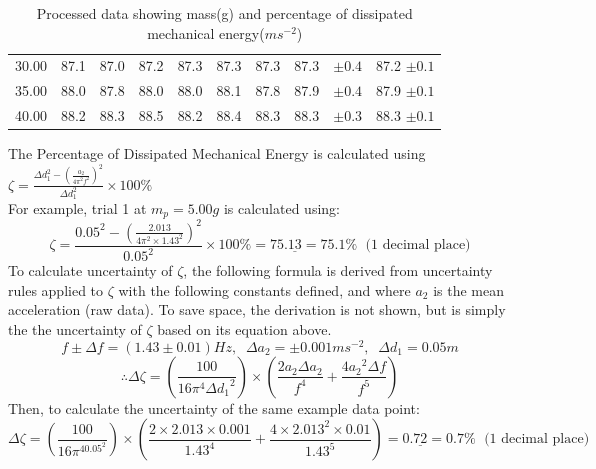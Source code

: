 \documentclass[11pt]{article}
\begin{document}
\begin{table}[h]
\begin{tabular}{cccccccccc}
\rowcolor[HTML]{EFEFEF} 
30.00                                                 & 87.1                                             & 87.0                                             & 87.2                                             & 87.3                                             & 87.3                                             & 87.3                                             & 87.3                                             & $\pm 0.4$                                                          & 87.2 $\pm 0.1$                                                     \\
35.00                                                 & \multicolumn{1}{r}{88.0}                         & \multicolumn{1}{r}{87.8}                         & \multicolumn{1}{r}{88.0}                         & \multicolumn{1}{r}{88.0}                         & \multicolumn{1}{r}{88.1}                         & \multicolumn{1}{r}{87.8}                         & \multicolumn{1}{r}{87.9}                         & $\pm 0.4$                                                          & 87.9 $\pm 0.1$                                                     \\
\rowcolor[HTML]{EFEFEF} 
40.00                                                 & \multicolumn{1}{r}{\cellcolor[HTML]{EFEFEF}88.2} & \multicolumn{1}{r}{\cellcolor[HTML]{EFEFEF}88.3} & \multicolumn{1}{r}{\cellcolor[HTML]{EFEFEF}88.5} & \multicolumn{1}{r}{\cellcolor[HTML]{EFEFEF}88.2} & \multicolumn{1}{r}{\cellcolor[HTML]{EFEFEF}88.4} & \multicolumn{1}{r}{\cellcolor[HTML]{EFEFEF}88.3} & \multicolumn{1}{r}{\cellcolor[HTML]{EFEFEF}88.3} & $\pm 0.3$                                                          & 88.3 $\pm 0.1$                                                    
\end{tabular}
\caption{\label{tbl:2}Processed data showing mass(g) and percentage of dissipated mechanical energy($ms^{-2}$)}
\end{table}


The Percentage of Dissipated Mechanical Energy is calculated using $\zeta=\frac{\Delta d_1^2-(\frac{a_2}{4\pi^2f^2})^2}{\Delta d_1^2} \times 100\%$ \\
For example, trial 1 at $m_p=5.00g$ is calculated using: 
$$\zeta=\frac{0.05^2-(\frac{2.013}{4\pi^2\times1.43^2})^2}{0.05^2} \times 100\% = 75.\underline{13}=75.1 \% \; \textrm{  (1 decimal place)}$$
To calculate uncertainty of $\zeta$, the following formula is derived from uncertainty rules applied to $\zeta$ with the following constants defined, and where $a_2$ is the mean acceleration (raw data). To save space, the derivation is not shown, but is simply the the uncertainty of $\zeta$ based on its equation above.
$$f \pm \Delta f = (1.43 \pm 0.01)Hz, \; \; \Delta a_2 = \pm 0.001ms^{-2}, \; \; \Delta d_1 = 0.05m$$
$$\therefore \Delta \zeta = (\frac{100}{16\pi^4\Delta {d_1}^2})\times(\frac{2a_2 \Delta a_2}{f^4} + \frac{4{a_2}^2\Delta f}{f^5})$$
Then, to calculate the uncertainty of the same example data point:
$$\Delta \zeta = (\frac{100}{16\pi^40.05^2})\times(\frac{2\times2.013 \times0.001}{1.43^4} + \frac{4\times2.013^2\times0.01}{1.43^5})=0.\underline{72}=0.7\% \; \textrm{  (1 decimal place)}$$
\end{document}
